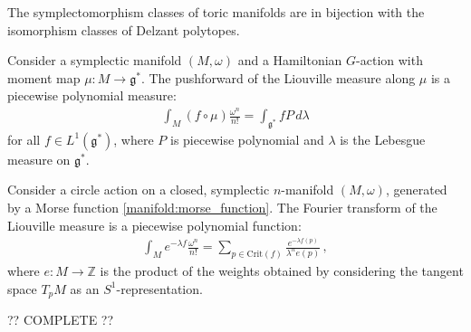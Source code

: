     \begin{theorem}[Delzant]
        The symplectomorphism classes of toric manifolds are in bijection with the isomorphism classes of Delzant polytopes.
    \end{theorem}

    \begin{theorem}
        Consider a symplectic manifold $(M,\omega)$ and a Hamiltonian $G$-action with moment map $\mu:M\rightarrow\mathfrak{g}^*$. The pushforward of the Liouville measure along $\mu$ is a piecewise polynomial measure:
        \begin{gather}
            \int_M (f\circ\mu)\frac{\omega^n}{n!} = \int_{\mathfrak{g}^*}fP\,d\lambda
        \end{gather}
        for all $f\in L^1(\mathfrak{g}^*)$, where $P$ is piecewise polynomial and $\lambda$ is the Lebesgue measure on $\mathfrak{g}^*$.
    \end{theorem}
    \begin{result}[Localization]
        Consider a circle action on a closed, symplectic $n$-manifold $(M,\omega)$, generated by a Morse function \ref{manifold:morse_function}. The Fourier transform of the Liouville measure is a piecewise polynomial function:
        \begin{gather}
            \int_Me^{-\lambda f}\frac{\omega^n}{n!} = \sum_{p\in\mathrm{Crit}(f)}\frac{e^{-\lambda f(p)}}{\lambda^n e(p)}\,,
        \end{gather}
        where $e:M\rightarrow\mathbb{Z}$ is the product of the weights obtained by considering the tangent space $T_pM$ as an $S^1$-representation.
    \end{result}

    ?? COMPLETE ??

